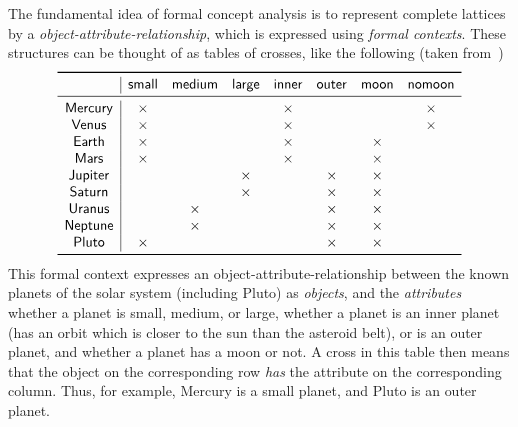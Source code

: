 The fundamental idea of formal concept analysis is to represent complete lattices by a
\emph{object-attribute-relationship}, which is expressed using \emph{formal contexts}.
These structures can be thought of as tables of crosses, like the following (taken
from~\cite{fca:Wille:1982})
\begin{equation*}
  \begin{array}[c]{c|*{7}{c}}
    \toprule
    ~       & \mathsf{small} & \mathsf{medium} & \mathsf{large} & \mathsf{inner} &
    \mathsf{outer} & \mathsf{moon} & \mathsf{no moon} \\
    \midrule
    \mathsf{Mercury} & \times &   &   & \times &   &   & \times  \\
    \mathsf{Venus}   & \times &   &   & \times &   &   & \times  \\
    \mathsf{Earth}   & \times &   &   & \times &   & \times &    \\
    \mathsf{Mars}    & \times &   &   & \times &   & \times &    \\
    \mathsf{Jupiter} &   &   & \times &   & \times & \times &    \\
    \mathsf{Saturn}  &   &   & \times &   & \times & \times &    \\
    \mathsf{Uranus}  &   & \times &   &   & \times & \times &    \\
    \mathsf{Neptune} &   & \times &   &   & \times & \times &    \\
    \mathsf{Pluto}   & \times &   &   &   & \times & \times &    \\
    \bottomrule
  \end{array}
\end{equation*}
This formal context expresses an object-attribute-relationship between the known planets
of the solar system (including Pluto) as \emph{objects}, and the \emph{attributes} whether
a planet is \textsf{small}, \textsf{medium}, or \textsf{large}, whether a planet is an
\textsf{inner} planet (\ie has an orbit which is closer to the sun than the asteroid
belt), or is an \textsf{outer} planet, and whether a planet has a \textsf{moon} or not.  A
cross in this table then means that the object on the corresponding row \emph{has} the
attribute on the corresponding column.  Thus, for example, \textsf{Mercury} is a
\textsf{small} planet, and \textsf{Pluto} is an \textsf{outer} planet.

